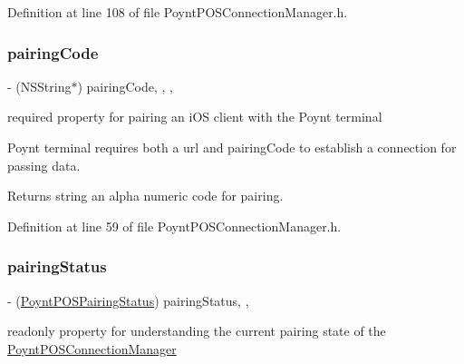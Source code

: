 Definition at line 108 of file Poynt\+P\+O\+S\+Connection\+Manager.\+h.

\hypertarget{interface_poynt_p_o_s_connection_manager_afb57bf61e0a6b264b5f2765f09a96d2b}{}\label{interface_poynt_p_o_s_connection_manager_afb57bf61e0a6b264b5f2765f09a96d2b} 
\subsubsection{\texorpdfstring{pairing\+Code}{pairingCode}}
{\footnotesize\ttfamily -\/ (N\+S\+String$\ast$) pairing\+Code\hspace{0.3cm}{\ttfamily [read]}, {\ttfamily [write]}, {\ttfamily [nonatomic]}, {\ttfamily [strong]}}



required property for pairing an i\+OS client with the Poynt terminal 

Poynt terminal requires both a url and pairing\+Code to establish a connection for passing data.

\begin{DoxyReturn}{Returns}
string an alpha numeric code for pairing. 
\end{DoxyReturn}


Definition at line 59 of file Poynt\+P\+O\+S\+Connection\+Manager.\+h.

\hypertarget{interface_poynt_p_o_s_connection_manager_ac623b382557bedf15142de86ee6e2782}{}\label{interface_poynt_p_o_s_connection_manager_ac623b382557bedf15142de86ee6e2782} 
\subsubsection{\texorpdfstring{pairing\+Status}{pairingStatus}}
{\footnotesize\ttfamily -\/ (\hyperlink{_poynt_p_o_s_connection_manager_8h_af6bc4a828ea6541e27d04eef1263513b}{Poynt\+P\+O\+S\+Pairing\+Status}) pairing\+Status\hspace{0.3cm}{\ttfamily [read]}, {\ttfamily [nonatomic]}, {\ttfamily [assign]}}



readonly property for understanding the current pairing state of the \hyperlink{interface_poynt_p_o_s_connection_manager}{Poynt\+P\+O\+S\+Connection\+Manager} 

